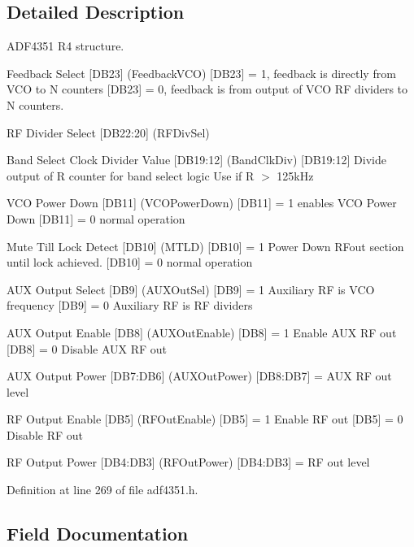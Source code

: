 \subsection{Detailed Description}
A\+D\+F4351 R4 structure. 

Feedback Select \mbox{[}D\+B23\mbox{]} (Feedback\+V\+CO) \mbox{[}D\+B23\mbox{]} = 1, feedback is directly from V\+CO to N counters \mbox{[}D\+B23\mbox{]} = 0, feedback is from output of V\+CO RF dividers to N counters.

RF Divider Select \mbox{[}D\+B22\+:20\mbox{]} (R\+F\+Div\+Sel)

Band Select Clock Divider Value \mbox{[}D\+B19\+:12\mbox{]} (Band\+Clk\+Div) \mbox{[}D\+B19\+:12\mbox{]} Divide output of R counter for band select logic Use if R $>$ 125k\+Hz

V\+CO Power Down \mbox{[}D\+B11\mbox{]} (V\+C\+O\+Power\+Down) \mbox{[}D\+B11\mbox{]} = 1 enables V\+CO Power Down \mbox{[}D\+B11\mbox{]} = 0 normal operation

Mute Till Lock Detect \mbox{[}D\+B10\mbox{]} (M\+T\+LD) \mbox{[}D\+B10\mbox{]} = 1 Power Down R\+Fout section until lock achieved. \mbox{[}D\+B10\mbox{]} = 0 normal operation

A\+UX Output Select \mbox{[}D\+B9\mbox{]} (A\+U\+X\+Out\+Sel) \mbox{[}D\+B9\mbox{]} = 1 Auxiliary RF is V\+CO frequency \mbox{[}D\+B9\mbox{]} = 0 Auxiliary RF is RF dividers

A\+UX Output Enable \mbox{[}D\+B8\mbox{]} (A\+U\+X\+Out\+Enable) \mbox{[}D\+B8\mbox{]} = 1 Enable A\+UX RF out \mbox{[}D\+B8\mbox{]} = 0 Disable A\+UX RF out

A\+UX Output Power \mbox{[}D\+B7\+:D\+B6\mbox{]} (A\+U\+X\+Out\+Power) \mbox{[}D\+B8\+:D\+B7\mbox{]} = A\+UX RF out level

RF Output Enable \mbox{[}D\+B5\mbox{]} (R\+F\+Out\+Enable) \mbox{[}D\+B5\mbox{]} = 1 Enable RF out \mbox{[}D\+B5\mbox{]} = 0 Disable RF out

RF Output Power \mbox{[}D\+B4\+:D\+B3\mbox{]} (R\+F\+Out\+Power) \mbox{[}D\+B4\+:D\+B3\mbox{]} = RF out level 

Definition at line 269 of file adf4351.\+h.



\subsection{Field Documentation}
